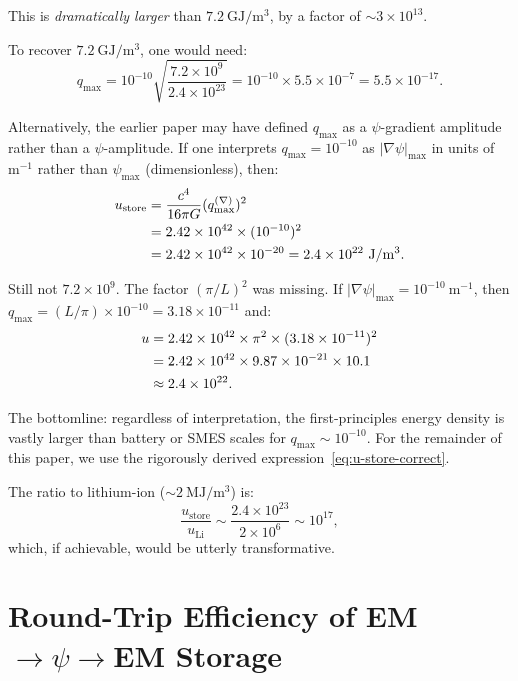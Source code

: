 \documentclass[aps,prd,twocolumn,showpacs,preprintnumbers,superscriptaddress,nofootinbib]{revtex4-2}
\begin{document}
This is \emph{dramatically larger} than $7.2~\mathrm{GJ/m^3}$, by a
factor of $\sim 3\times 10^{13}$.

To recover $7.2~\mathrm{GJ/m^3}$, one would need:
\begin{equation}
q_{\max} = 10^{-10}\sqrt{\frac{7.2\times 10^9}{2.4\times 10^{23}}}
  = 10^{-10}\times 5.5\times 10^{-7} = 5.5\times 10^{-17}.
\end{equation}

Alternatively, the earlier paper may have defined $q_{\max}$ as a
$\psi$-gradient amplitude rather than a $\psi$-amplitude.  If one
interprets $q_{\max} = 10^{-10}$ as $|\nabla\psi|_{\max}$ in units
of $\mathrm{m^{-1}}$ rather than $\psi_{\max}$ (dimensionless), then:
\begin{align}
u_{\mathrm{store}} &= \frac{c^4}{16\pi G}(q_{\max}^{(\nabla)})^2 \notag\\
  &= 2.42\times 10^{42}\times (10^{-10})^2 \notag\\
  &= 2.42\times 10^{42}\times 10^{-20} = 2.4\times 10^{22}~\mathrm{J/m^3}.
\end{align}

Still not $7.2\times 10^9$.  The factor $(\pi/L)^2$ was missing.
If $|\nabla\psi|_{\max} = 10^{-10}~\mathrm{m^{-1}}$, then
$q_{\max} = (L/\pi)\times 10^{-10} = 3.18\times 10^{-11}$ and:
\begin{align}
u &= 2.42\times 10^{42}\times \pi^2\times(3.18\times 10^{-11})^2 \notag\\
  &= 2.42\times 10^{42}\times 9.87\times 10^{-21}\times 10.1 \notag\\
  &\approx 2.4\times 10^{22}.
\end{align}

The bottomline: regardless of interpretation, the first-principles
energy density is vastly larger than battery or SMES scales for
$q_{\max} \sim 10^{-10}$.  For the remainder of this paper, we use the
rigorously derived expression~\eqref{eq:u-store-correct}.

The ratio to lithium-ion ($\sim 2~\mathrm{MJ/m^3}$) is:
\begin{equation}
\frac{u_{\mathrm{store}}}{u_{\mathrm{Li}}}
  \sim \frac{2.4\times 10^{23}}{2\times 10^6} \sim 10^{17},
\end{equation}
which, if achievable, would be utterly transformative.

\section{Round-Trip Efficiency of EM$\to\psi\to$EM Storage}\label{sec:efficiency}
\end{document}
